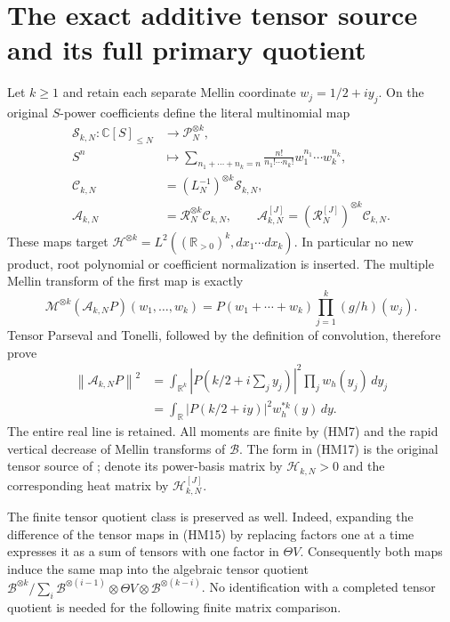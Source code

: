 \documentclass[11pt]{article}
\newcommand{\C}{\mathbb C}\newcommand{\R}{\mathbb R}
\newcommand{\B}{\mathscr B}\newcommand{\M}{\mathcal M}
\newcommand{\PP}{\mathcal P}\newcommand{\Hh}{\mathcal H}
\newcommand{\norm}[1]{\left\lVert#1\right\rVert}
\begin{document}
\section{The exact additive tensor source and its full primary quotient}
Let $k\ge1$ and retain each separate Mellin coordinate $w_j=1/2+iy_j$.
On the original $S$-power coefficients define the literal multinomial map
\begin{equation}\tag{HM15}
 \begin{aligned}
 \mathcal S_{k,N}:\C[S]_{\le N}&\longrightarrow\PP_N^{\otimes k},\\
 S^n&\longmapsto
 \sum_{n_1+\cdots+n_k=n}\frac{n!}{n_1!\cdots n_k!}
                     w_1^{n_1}\cdots w_k^{n_k},\\
 \mathcal C_{k,N}&=(L_N^{-1})^{\otimes k}\mathcal S_{k,N},\\
 \mathcal A_{k,N}&=\mathcal R_N^{\otimes k}\mathcal C_{k,N},\qquad
 \mathcal A_{k,N}^{[J]}=(\mathcal R_N^{[J]})^{\otimes k}\mathcal C_{k,N}.
 \end{aligned}
\end{equation}
These maps target $\Hh^{\otimes k}=L^2((\R_{>0})^k,dx_1\cdots dx_k)$.
In particular no new product, root polynomial or coefficient normalization
is inserted. The multiple Mellin transform of the first map is exactly
\begin{equation}\tag{HM16}
 \M^{\otimes k}(\mathcal A_{k,N}P)(w_1,\ldots,w_k)
       =P(w_1+\cdots+w_k)\prod_{j=1}^k(g/h)(w_j).
\end{equation}
Tensor Parseval and Tonelli, followed by the definition of convolution,
therefore prove
\begin{equation}\tag{HM17}
 \begin{aligned}
 \norm{\mathcal A_{k,N}P}^2
 &=\int_{\R^k}|P(k/2+i\textstyle\sum_jy_j)|^2
                                  \prod_j w_h(y_j)\,dy_j\\
 &=\int_\R|P(k/2+iy)|^2w_h^{*k}(y)\,dy.
 \end{aligned}
\end{equation}
The entire real line is retained. All moments are finite by (HM7) and
the rapid vertical decrease of Mellin transforms of $\B$. The form in
(HM17) is the original tensor source of \cite{fullwindow}; denote its
power-basis matrix by $\mathcal H_{k,N}>0$ and the corresponding heat
matrix by $\mathcal H_{k,N}^{[J]}$.

The finite tensor quotient class is preserved as well. Indeed, expanding
the difference of the tensor maps in (HM15) by replacing factors one at
a time expresses it as a sum of tensors with one factor in $\Theta V$.
Consequently both maps induce the same map into the algebraic tensor
quotient $\B^{\otimes k}/\sum_i\B^{\otimes(i-1)}\otimes\Theta V
\otimes\B^{\otimes(k-i)}$. No identification with a completed tensor
quotient is needed for the following finite matrix comparison.
\end{document}
